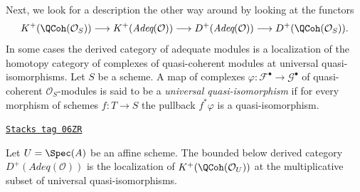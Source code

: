 Next, we look for a description the other way around by looking at
the functors
$$
K^+(\QCoh(\mathcal{O}_S))
\longrightarrow
K^+(\textit{Adeq}(\mathcal{O}))
\longrightarrow
D^+(\textit{Adeq}(\mathcal{O}))
\longrightarrow
D^+(\QCoh(\mathcal{O}_S)).
$$
In some cases the derived category of adequate modules is a localization
of the homotopy category of complexes of quasi-coherent modules at
universal quasi-isomorphisms. Let $S$ be a scheme. A map of complexes
$\varphi : \mathcal{F}^\bullet \to \mathcal{G}^\bullet$
of quasi-coherent $\mathcal{O}_S$-modules is said to be a
{\it universal quasi-isomorphism} if for every morphism of schemes
$f : T \to S$ the pullback $f^*\varphi$ is a quasi-isomorphism.

\begin{lemma}
\label{adequate-lemma-describe-Dplus-adequate}
\href{https://stacks.math.columbia.edu/tag/06ZR}{\texttt{Stacks tag 06ZR}}

Let $U = \Spec(A)$ be an affine scheme.
The bounded below derived category
$D^+(\textit{Adeq}(\mathcal{O}))$ is the localization
of $K^+(\QCoh(\mathcal{O}_U))$ at the multiplicative subset of
universal quasi-isomorphisms.
\end{lemma}

